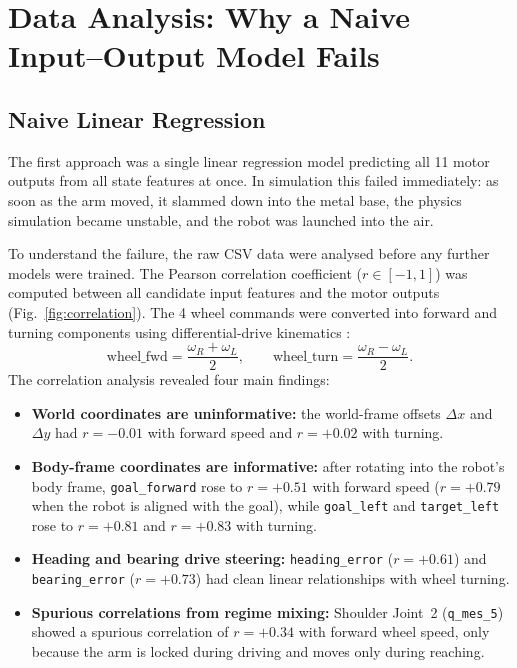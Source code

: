 \documentclass[conference]{IEEEtran}
\begin{document}
\section{Data Analysis: Why a Naive Input--Output Model Fails}
\label{sec:analysis}

\subsection{Naive Linear Regression}
The first approach was a single linear regression model predicting all 11 motor outputs from all state features at once. In simulation this failed immediately: as soon as the arm moved, it slammed down into the metal base, the physics simulation became unstable, and the robot was launched into the air.

To understand the failure, the raw CSV data were analysed before any further models were trained. The Pearson correlation coefficient ($r \in [-1, 1]$) was computed between all candidate input features and the motor outputs (Fig.~\ref{fig:correlation}). The 4 wheel commands were converted into forward and turning components using differential-drive kinematics \cite{siegwart2011autonomous}:
\begin{equation}
\text{wheel\_fwd} = \frac{\omega_R + \omega_L}{2}, \qquad \text{wheel\_turn} = \frac{\omega_R - \omega_L}{2}.
\end{equation}
The correlation analysis revealed four main findings:
\begin{itemize}
    \item \textbf{World coordinates are uninformative:} the world-frame offsets $\Delta x$ and $\Delta y$ had $r = -0.01$ with forward speed and $r = +0.02$ with turning.
    \item \textbf{Body-frame coordinates are informative:} after rotating into the robot's body frame, \texttt{goal\_forward} rose to $r = +0.51$ with forward speed ($r = +0.79$ when the robot is aligned with the goal), while \texttt{goal\_left} and \texttt{target\_left} rose to $r = +0.81$ and $r = +0.83$ with turning.
    \item \textbf{Heading and bearing drive steering:} \texttt{heading\_error} ($r = +0.61$) and \texttt{bearing\_error} ($r = +0.73$) had clean linear relationships with wheel turning.
    \item \textbf{Spurious correlations from regime mixing:} Shoulder Joint~2 (\texttt{q\_mes\_5}) showed a spurious correlation of $r = +0.34$ with forward wheel speed, only because the arm is locked during driving and moves only during reaching.
\end{itemize}
\end{document}
